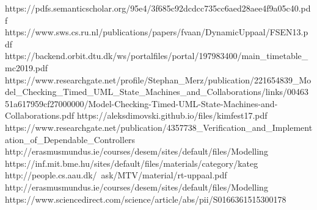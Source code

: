 \documentclass[a4paper,12pt]{article}
\begin{document}
\begin{thebibliography}{9}
https://pdfs.semanticscholar.org/95e4/3f685c92dcdcc735cc6aed28aee4f9a05c40.pdf
https://www.sws.cs.ru.nl/publications/papers/fvaan/DynamicUppaal/FSEN13.pdf
https://backend.orbit.dtu.dk/ws/portalfiles/portal/197983400/main_timetable_mc2019.pdf
https://www.researchgate.net/profile/Stephan_Merz/publication/221654839_Model_Checking_Timed_UML_State_Machines_and_Collaborations/links/0046351a617959cf27000000/Model-Checking-Timed-UML-State-Machines-and-Collaborations.pdf
https://aleksdimovski.github.io/files/kimfest17.pdf
https://www.researchgate.net/publication/4357738_Verification_and_Implementation_of_Dependable_Controllers
http://erasmusmundus.ie/courses/desem/sites/default/files/Modelling%
https://inf.mit.bme.hu/sites/default/files/materials/category/kateg%
http://people.cs.aau.dk/~ask/MTV/material/rt-uppaal.pdf
http://erasmusmundus.ie/courses/desem/sites/default/files/Modelling%
https://www.sciencedirect.com/science/article/abs/pii/S0166361515300178






\end{thebibliography}
\end{document}
